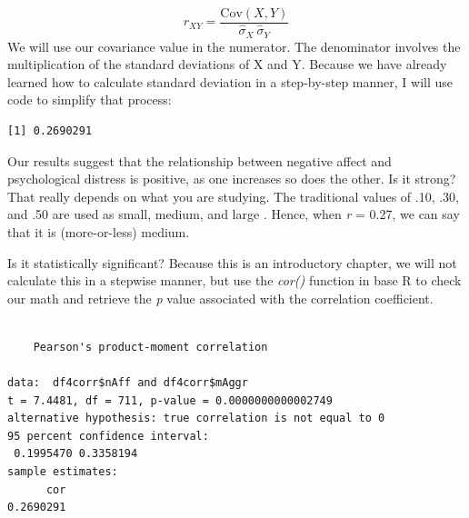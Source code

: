 \documentclass[
  11pt,
]{book}
\newenvironment{Shaded}{\begin{snugshade}}{\end{snugshade}}
\newcommand{\FunctionTok}[1]{\textcolor[rgb]{0.00,0.00,0.00}{#1}}
\newcommand{\NormalTok}[1]{#1}
\newcommand{\SpecialCharTok}[1]{\textcolor[rgb]{0.00,0.00,0.00}{#1}}
\begin{document}
\[
r_{XY}  = \frac{\mbox{Cov}(X,Y)}{ \hat{\sigma}_X \ \hat{\sigma}_Y}
\]
We will use our covariance value in the numerator. The denominator involves the multiplication of the standard deviations of X and Y. Because we have already learned how to calculate standard deviation in a step-by-step manner, I will use code to simplify that process:

\begin{Shaded}
\end{Shaded}

\begin{verbatim}
[1] 0.2690291
\end{verbatim}

Our results suggest that the relationship between negative affect and psychological distress is positive, as one increases so does the other. Is it strong? That really depends on what you are studying. The traditional values of .10, .30, and .50 are used as small, medium, and large \citep{cohen_applied_2003}. Hence, when \emph{r} = 0.27, we can say that it is (more-or-less) medium.

Is it statistically significant? Because this is an introductory chapter, we will not calculate this in a stepwise manner, but use the \emph{cor()} function in base R to check our math and retrieve the \emph{p} value associated with the correlation coefficient.

\begin{Shaded}
\end{Shaded}

\begin{verbatim}

    Pearson's product-moment correlation

data:  df4corr$nAff and df4corr$mAggr
t = 7.4481, df = 711, p-value = 0.0000000000002749
alternative hypothesis: true correlation is not equal to 0
95 percent confidence interval:
 0.1995470 0.3358194
sample estimates:
      cor 
0.2690291 
\end{verbatim}
\end{document}
